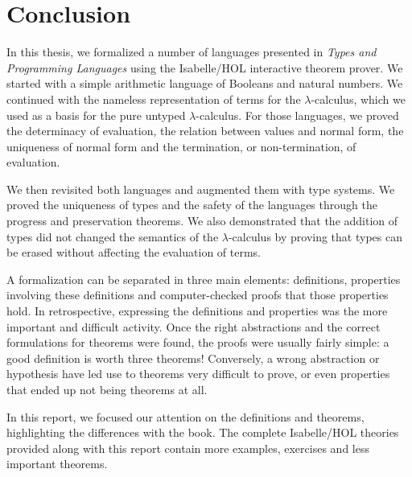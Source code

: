 \section{Conclusion}

In this thesis, we formalized a number of languages presented in \emph{Types and Programming
Languages} using the Isabelle/HOL interactive theorem prover. We started with a simple arithmetic
language of Booleans and natural numbers. We continued with the nameless representation of terms for
the $\lambda$-calculus, which we used as a basis for the pure untyped $\lambda$-calculus. For those
languages, we proved the determinacy of evaluation, the relation between values and normal form, the
uniqueness of normal form and the termination, or non-termination, of evaluation.

We then revisited both languages and augmented them with type systems. We proved the uniqueness of
types and the safety of the languages through the progress and preservation theorems. We also
demonstrated that the addition of types did not changed the semantics of the $\lambda$-calculus by
proving that types can be erased without affecting the evaluation of terms.

A formalization can be separated in three main elements: definitions, properties involving these
definitions and computer-checked proofs that those properties hold. In retrospective, expressing the
definitions and properties was the more important and difficult activity. Once the right
abstractions and the correct formulations for theorems were found, the proofs were usually fairly
simple: a good definition is worth three theorems! Conversely, a wrong abstraction or hypothesis
have led use to theorems very difficult to prove, or even properties that ended up not being
theorems at all.

In this report, we focused our attention on the definitions and theorems, highlighting the
differences with the book. The complete Isabelle/HOL theories provided along with this report
contain more examples, exercises and less important theorems.
